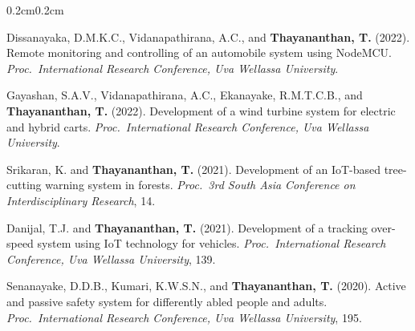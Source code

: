 \documentclass[10pt, letterpaper]{article}
\newcommand{\textbfr}[1]{\textbf{#1}}
\newenvironment{onecolentry}{%
    \begin{adjustwidth}{0.2cm}{0.2cm}
}{\end{adjustwidth}}
\newenvironment{pubsU}{%
  \begin{enumerate}[label={[U\arabic*]}, leftmargin=1.15cm, labelsep=0.2cm,
                    topsep=0.08cm, parsep=0.08cm, partopsep=0pt, itemsep=0pt]
}{\end{enumerate}}
\begin{document}
\begin{onecolentry}
\begin{pubsU}
    \item Dissanayaka, D.M.K.C., Vidanapathirana, A.C., and
    \textbfr{Thayananthan, T.} (2022). Remote monitoring and controlling of an
    automobile system using NodeMCU. \emph{Proc.\ International Research Conference,
    Uva Wellassa University}.

    \item Gayashan, S.A.V., Vidanapathirana, A.C., Ekanayake, R.M.T.C.B., and
    \textbfr{Thayananthan, T.} (2022). Development of a wind turbine system for
    electric and hybrid carts. \emph{Proc.\ International Research Conference,
    Uva Wellassa University}.

    \item Srikaran, K. and \textbfr{Thayananthan, T.} (2021). Development of an
    IoT-based tree-cutting warning system in forests. \emph{Proc.\ 3rd South Asia
    Conference on Interdisciplinary Research}, 14.

    \item Danijal, T.J. and \textbfr{Thayananthan, T.} (2021). Development of a
    tracking over-speed system using IoT technology for vehicles.
    \emph{Proc.\ International Research Conference, Uva Wellassa University}, 139.

    \item Senanayake, D.D.B., Kumari, K.W.S.N., and \textbfr{Thayananthan, T.}
    (2020). Active and passive safety system for differently abled people and adults.
    \emph{Proc.\ International Research Conference, Uva Wellassa University}, 195.

\end{pubsU}
\end{onecolentry}
\vspace{0.10cm}

\end{document}
